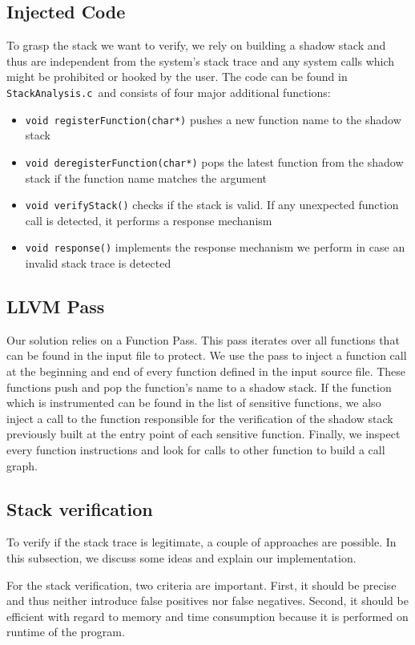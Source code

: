 \documentclass{llncs}
\newcommand{\stacka}{\texttt{StackAnalysis.c }}
\begin{document}
\subsection{Injected Code}
To grasp the stack we want to verify, we rely on building a shadow stack and thus are independent from the system's stack trace and any system calls which might be prohibited or hooked by the user. The code can be found in \stacka and consists of four major additional functions:
\begin{itemize}
\item \texttt{void registerFunction(char*)} pushes a new function name to the shadow stack
\item \texttt{void deregisterFunction(char*)} pops the latest function from the shadow stack if the function name matches the argument
\item \texttt{void verifyStack()} checks if the stack is valid. If any unexpected function call is detected, it performs a response mechanism
\item \texttt{void response()} implements the response mechanism we perform in case an invalid stack trace is detected
\end{itemize}

\subsection{LLVM Pass}
Our solution relies on a Function Pass. This pass iterates over all functions that can be found in the input file to protect. We use the pass to inject a function call at the beginning and end of every function defined in the input source file. These functions push and pop the function's name to a shadow stack. If the function which is instrumented can be found in the list of sensitive functions, we also inject a call to the function responsible for the verification of the shadow stack previously built at the entry point of each sensitive function. Finally, we inspect every function instructions and look for calls to other function to build a call graph.

\subsection{Stack verification}
To verify if the stack trace is legitimate, a couple of approaches are possible. In this subsection, we discuss some ideas and explain our implementation.

For the stack verification, two criteria are important. First, it should be precise and thus neither introduce false positives nor false negatives. Second, it should be efficient with regard to memory and time consumption because it is performed on runtime of the program.
\end{document}
